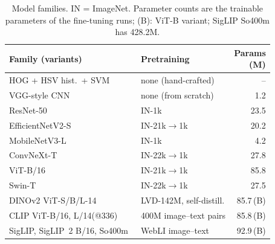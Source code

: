 \documentclass[conference]{IEEEtran}
\begin{document}
\begin{table}[t]
\centering\footnotesize
\caption{Model families. IN = ImageNet. Parameter counts are the trainable parameters of the fine-tuning runs;
(B): ViT-B variant; SigLIP So400m has 428.2M.}
\label{tab:taxonomy}
\begin{tabular}{@{}l@{\hspace{4pt}}l@{\hspace{3pt}}r@{}}
\toprule
Family (variants) & Pretraining & \shortstack{Params\\(M)} \\
\midrule
HOG + HSV hist.\ + SVM~\cite{dalal2005hog,cortes1995svm} & none (hand-crafted) & -- \\
VGG-style CNN~\cite{simonyan2014vgg,ioffe2015bn} & none (from scratch) & 1.2 \\
ResNet-50~\cite{he2016resnet,wightman2021rsb} & IN-1k & 23.5 \\
EfficientNetV2-S~\cite{tan2021efficientnetv2} & IN-21k$\to$1k & 20.2 \\
MobileNetV3-L~\cite{howard2019mobilenetv3} & IN-1k & 4.2 \\
ConvNeXt-T~\cite{liu2022convnext} & IN-22k$\to$1k & 27.8 \\
ViT-B/16~\cite{dosovitskiy2020vit,steiner2022augreg} & IN-21k$\to$1k & 85.8 \\
Swin-T~\cite{liu2021swin} & IN-22k$\to$1k & 27.5 \\
DINOv2 ViT-S/B/L-14~\cite{oquab2023dinov2} & LVD-142M, self-distill. & 85.7\,(B) \\
CLIP ViT-B/16, L/14(@336)~\cite{radford2021clip} & 400M image--text pairs & 85.8\,(B) \\
SigLIP, SigLIP~2 B/16, So400m~\cite{zhai2023siglip,tschannen2025siglip2} & WebLI image--text & 92.9\,(B) \\
\bottomrule
\end{tabular}
\end{table}
\end{document}
